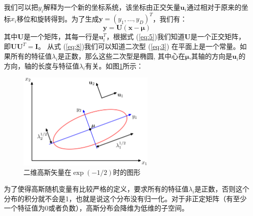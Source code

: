 \documentclass[10pt,a4paper,UTF8]{article}
\begin{document}
我们可以把\(y_{i}\)解释为一个新的坐标系统，该坐标由正交矢量\(\mathbf{u}_{i}\)通过相对于原来的坐标\(x_{i}\)移位和旋转得到。为了生成\(\mathbf{y}= (y_{1},\ldots ,y_{D})^{T}\)，我们有：
\begin{equation}
\label{eq:10}
\mathbf{y} = \mathbf{U}(\mathbf{x}- \mathbf{\mu})
\end{equation}
其中\(\mathbf{U}\)是一个矩阵，其每一行是\(\mathbf{u}_{i}^{T}\)，根据式 (\ref{eq:5})我们知道\(\mathbf{U}\)是一个正交矩阵，即\(\mathbf{U}\mathbf{U}^{T} = \mathbf{I}\)。 从式 (\ref{eq:8})我们可以知道二次型 (\ref{eq:3}) 在平面上是一个常量。如果所有的特征值\(\lambda_{i}\)是正数，那么这些二次型是椭圆, 其中心在\(\mathbf{\mu}\),其轴的方向是\(\mathbf{u}_{i}\)的方向，轴的长度与特征值\(\lambda_{i}\)有关。如图\ref{fig:org0ba871c}所示：
\begin{figure}[htbp]
\centering
\includegraphics[width=0.6\textwidth]{../../img/computer_prml/20170614figure2dot7.png}
\caption{\label{fig:org0ba871c}
二维高斯矢量在\(\exp(-1/2)\)时的图形}
\end{figure}


为了使得高斯随机变量有比较严格的定义，要求所有的特征值\(\lambda_{i}\)是正数，否则这个分布的积分就不会是1，也就是说这个分布没有归一化。对于非正定矩阵（有至少一个特征值为0或者负数），高斯分布会降维为低维的子空间。
\end{document}

